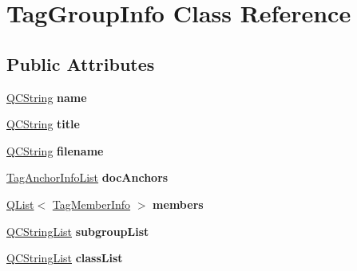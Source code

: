 \hypertarget{class_tag_group_info}{}\section{Tag\+Group\+Info Class Reference}
\label{class_tag_group_info}
\subsection*{Public Attributes}
\begin{DoxyCompactItemize}
\item 
\mbox{\label{class_tag_group_info_affa871defcfc2321f6897fc91fd1a585}} 
\mbox{\hyperlink{class_q_c_string}{Q\+C\+String}} {\bfseries name}
\item 
\mbox{\label{class_tag_group_info_a985d71c6502715a18d431e87f70abd53}} 
\mbox{\hyperlink{class_q_c_string}{Q\+C\+String}} {\bfseries title}
\item 
\mbox{\label{class_tag_group_info_a29015cfc8a0dfd3c85195a89df934e18}} 
\mbox{\hyperlink{class_q_c_string}{Q\+C\+String}} {\bfseries filename}
\item 
\mbox{\label{class_tag_group_info_a44b3fd0436ffa10f91155a7c0e7e957b}} 
\mbox{\hyperlink{class_tag_anchor_info_list}{Tag\+Anchor\+Info\+List}} {\bfseries doc\+Anchors}
\item 
\mbox{\label{class_tag_group_info_a043b00429c1dd064f2f00e6ad2c0ba26}} 
\mbox{\hyperlink{class_q_list}{Q\+List}}$<$ \mbox{\hyperlink{class_tag_member_info}{Tag\+Member\+Info}} $>$ {\bfseries members}
\item 
\mbox{\label{class_tag_group_info_a43fe2d8910335749011324d6f15c5ec4}} 
\mbox{\hyperlink{class_q_c_string_list}{Q\+C\+String\+List}} {\bfseries subgroup\+List}
\item 
\mbox{\label{class_tag_group_info_a19e10dd25dfca8e3e1c7c1705ea68f29}} 
\mbox{\hyperlink{class_q_c_string_list}{Q\+C\+String\+List}} {\bfseries class\+List}
\item 
\mbox{\label{class_tag_group_info_a58055b8345ac5678109ae03a915bae8a}} 

\end{DoxyCompactItemize}
